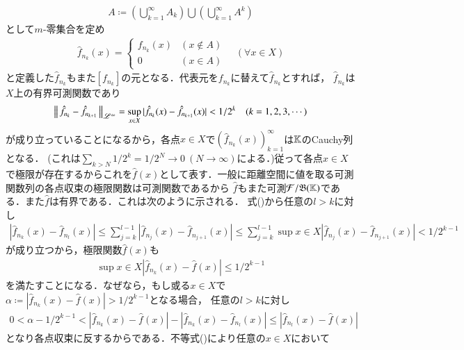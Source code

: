 \begin{prf}
\begin{description}
			\begin{align}
				A \coloneqq \left( \bigcup_{k=1}^{\infty} A_k \right) \bigcup \left( \bigcup_{k=1}^{\infty} A^k \right)
			\end{align}
			として$m$-零集合を定め
			\begin{align}
				\hat{f}_{n_k}(x) =
				\begin{cases}
					f_{n_k}(x) & (x \notin A) \\
					0 & (x \in A)
				\end{cases}
				\quad (\forall x \in X)
			\end{align}
			と定義した$\hat{f}_{n_k}$もまた$[f_{n_k}]$の元となる．代表元を$f_{n_k}$に替えて$\hat{f}_{n_k}$とすれば，
			$\hat{f}_{n_k}$は$X$上の有界可測関数であり
			\begin{align}
				\left\|\, \hat{f}_{n_k} - \hat{f}_{n_{k+1}}\, \right\|_{\mathscr{L}^\infty} = \operatorname*{sup}_{x \in X} |\hat{f}_{n_k}(x) - \hat{f}_{n_{k+1}}(x)| < 1/2^k \quad (k=1,2,3,\cdots) 
				\label{ineq:Lp_banach_1}
			\end{align}
			が成り立っていることになるから，各点$x \in X$で$\left( \hat{f}_{n_k}(x) \right)_{k=1}^{\infty}$は$\mathbb{K}$のCauchy列となる．
			(これは$\sum_{k > N} 1/2^k = 1/2^N \longrightarrow 0\ (N \longrightarrow \infty)$による．)従って各点$x \in X$
			で極限が存在するからこれを$\hat{f}(x)$として表す．一般に距離空間に値を取る可測関数列の各点収束の極限関数は可測関数であるから
			$\hat{f}$もまた可測$\mathcal{F}/\mathfrak{B}(\mathbb{K})$である．また$\hat{f}$は有界である．これは次のように示される．
			式()から任意の$l > k$に対し
			\begin{align}
				|\hat{f}_{n_k}(x) - \hat{f}_{n_l}(x)| \leq \sum_{j=k}^{l-1} |\hat{f}_{n_{j}}(x) - \hat{f}_{n_{j+1}}(x)| 
				\leq \sum_{j=k}^{l-1} \sup{x \in X}{|\hat{f}_{n_j}(x) - \hat{f}_{n_{j+1}}(x)|} < 1/2^{k-1}
			\end{align}
			が成り立つから，極限関数$\hat{f}(x)$も
			\begin{align}
				\sup{x \in X}{|\hat{f}_{n_k}(x) - \hat{f}(x)|} \leq 1/2^{k-1} \label{ineq:Lp_banach_3}
			\end{align}
			を満たすことになる．なぜなら，もし或る$x \in X$で$\alpha \coloneqq |\hat{f}_{n_k}(x) - \hat{f}(x)| > 1/2^{k-1}$となる場合，
			任意の$l > k$に対し
			\begin{align}
				0 < \alpha - 1/2^{k-1} < |\hat{f}_{n_k}(x) - \hat{f}(x)| - |\hat{f}_{n_k}(x) - \hat{f}_{n_l}(x)| \leq |\hat{f}_{n_l}(x) - \hat{f}(x)|
			\end{align}
			となり各点収束に反するからである．不等式()により任意の$x \in X$において

\end{description}
\end{prf}
